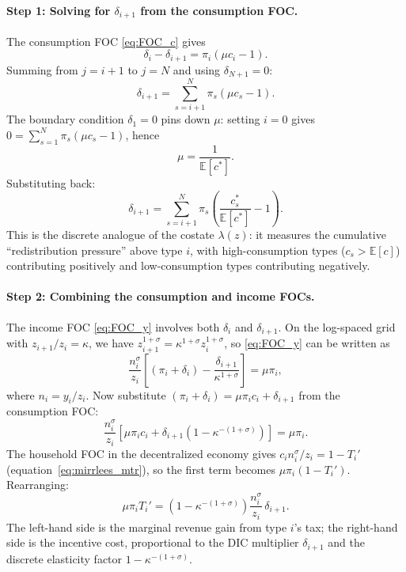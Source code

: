 \documentclass[12pt,a4paper]{article}
\theoremstyle{definition}
\theoremstyle{plain}
\theoremstyle{remark}
\newcommand{\E}{\mathbb{E}}
\begin{document}
\paragraph{Step 1: Solving for $\delta_{i+1}$ from the consumption FOC.}
The consumption FOC \eqref{eq:FOC_c} gives
\[
  \delta_i - \delta_{i+1} = \pi_i(\mu c_i - 1).
\]
Summing from $j = i+1$ to $j = N$ and using $\delta_{N+1} = 0$:
\begin{equation}
\label{eq:delta_discrete_sum}
  \delta_{i+1} = \sum_{s=i+1}^{N} \pi_s(\mu c_s - 1).
\end{equation}
The boundary condition $\delta_1 = 0$ pins down $\mu$: setting $i = 0$ gives $0 = \sum_{s=1}^{N} \pi_s(\mu c_s - 1)$, hence
\begin{equation}
\label{eq:mu_discrete}
  \mu = \frac{1}{\E[c^*]}.
\end{equation}
Substituting back:
\begin{equation}
\label{eq:delta_discrete}
  \delta_{i+1} = \sum_{s=i+1}^{N} \pi_s \left(\frac{c_s^*}{\E[c^*]} - 1\right).
\end{equation}
This is the discrete analogue of the costate $\lambda(z)$: it measures the cumulative ``redistribution pressure'' above type $i$, with high-consumption types ($c_s > \E[c]$) contributing positively and low-consumption types contributing negatively.

\paragraph{Step 2: Combining the consumption and income FOCs.}
The income FOC \eqref{eq:FOC_y} involves both $\delta_i$ and $\delta_{i+1}$. On the log-spaced grid with $z_{i+1}/z_i = \kappa$, we have $z_{i+1}^{1+\sigma} = \kappa^{1+\sigma} z_i^{1+\sigma}$, so \eqref{eq:FOC_y} can be written as
\[
  \frac{n_i^{\sigma}}{z_i}\left[(\pi_i + \delta_i) - \frac{\delta_{i+1}}{\kappa^{1+\sigma}}\right] = \mu\pi_i,
\]
where $n_i = y_i/z_i$. Now substitute $(\pi_i + \delta_i) = \mu \pi_i c_i + \delta_{i+1}$ from the consumption FOC:
\[
  \frac{n_i^{\sigma}}{z_i}\left[\mu \pi_i c_i + \delta_{i+1}\!\left(1 - \kappa^{-(1+\sigma)}\right)\right] = \mu\pi_i.
\]
The household FOC in the decentralized economy gives $c_i n_i^{\sigma}/z_i = 1 - T_i'$ (equation~\eqref{eq:mirrlees_mtr}), so the first term becomes $\mu \pi_i (1-T_i')$. Rearranging:
\begin{equation}
\label{eq:discrete_tax_intermediate}
  \mu \pi_i T_i' = \left(1 - \kappa^{-(1+\sigma)}\right) \frac{n_i^{\sigma}}{z_i}\, \delta_{i+1}.
\end{equation}
The left-hand side is the marginal revenue gain from type $i$'s tax; the right-hand side is the incentive cost, proportional to the DIC multiplier $\delta_{i+1}$ and the discrete elasticity factor $1 - \kappa^{-(1+\sigma)}$.
\end{document}
